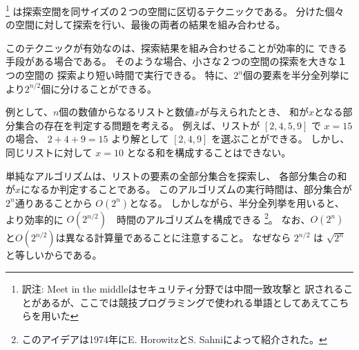 
 \footnote{訳注: Meet in the middleはセキュリティ分野では中間一致攻撃と
訳されることがあるが、ここでは競技プログラミングで使われる単語としてあえてこちらを用いた}
は探索空間を同サイズの２つの空間に区切るテクニックである。
分けた個々の空間に対して探索を行い、最後の両者の結果を組み合わせる。

このテクニックが有効なのは、探索結果を組み合わせることが効率的に
できる手段がある場合である。
そのような場合、小さな２つの空間の探索を大きな１つの空間の
探索より短い時間で実行できる。
特に、$2^n$個の要素を半分全列挙により$2^{n/2}$個に分けることができる。

\begin{comment}
As an example, consider a problem where
we are given a list of $n$ numbers and
a number $x$,
and we want to find out if it is possible
to choose some numbers from the list so that
their sum is $x$.
For example, given the list $[2,4,5,9]$ and $x=15$,
we can choose the numbers $[2,4,9]$ to get $2+4+9=15$.
However, if $x=10$ for the same list,
it is not possible to form the sum.

A simple algorithm to the problem is to
go through all subsets of the elements and
check if the sum of any of the subsets is $x$.
The running time of such an algorithm is $O(2^n)$,
because there are $2^n$ subsets.
However, using the meet in the middle technique,
we can achieve a more efficient $O(2^{n/2})$ time algorithm\footnote{This
idea was introduced in 1974 by E. Horowitz and S. Sahni \cite{hor74}.}.
Note that $O(2^n)$ and $O(2^{n/2})$ are different
complexities because $2^{n/2}$ equals $\sqrt{2^n}$.
\end{comment}

例として、$n$個の数値からなるリストと数値$x$が与えられたとき、
和が$x$となる部分集合の存在を判定する問題を考える。
例えば、リストが $[2,4,5,9]$ で $x=15$ の場合、
$2+4+9=15$ より解として $[2,4,9]$ を選ぶことができる。
しかし、同じリストに対して $x=10$ となる和を構成することはできない。

単純なアルゴリズムは、リストの要素の全部分集合を探索し、
各部分集合の和が$x$になるか判定することである。
このアルゴリズムの実行時間は、部分集合が$2^n$通りあることから
$O(2^n)$となる。
しかしながら、半分全列挙を用いると、より効率的に
$O(2^{n/2})$　時間のアルゴリズムを構成できる
\footnote{このアイデアは1974年にE. HorowitzとS. Sahniによって紹介された\cite{hor74}。}。
なお、$O(2^n)$と$O(2^{n/2})$は異なる計算量であることに注意すること。
なぜなら $2^{n/2}$ は $\sqrt{2^n}$ と等しいからである。

